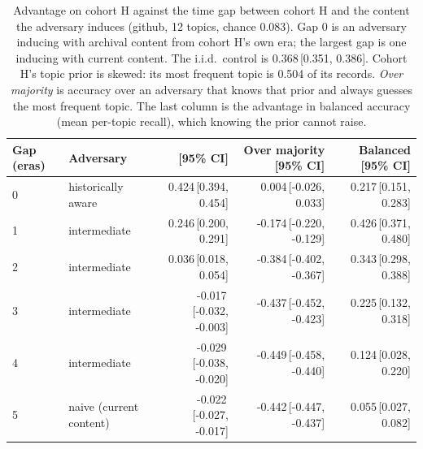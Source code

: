 \begin{table}[t]
\centering
\caption{Advantage on cohort H against the time gap between cohort H and the content the
adversary induces (github, 12 topics, chance
0.083). Gap 0 is an adversary inducing with archival content from cohort H's own
era; the largest gap is one inducing with current content. The i.i.d.\ control is
0.368\,[0.351, 0.386]. Cohort H's topic prior is skewed: its most frequent topic is
0.504 of its records. \emph{Over majority} is accuracy over an adversary
that knows that prior and always guesses the most frequent topic. The last column is the advantage in balanced accuracy (mean per-topic recall), which knowing the prior cannot raise.}
\label{tab:e4}
\small
\setlength{\tabcolsep}{4pt}
\begin{tabular}{llrrr}
\toprule
Gap (eras) & Adversary & \advhist{} [95\% CI] & Over majority [95\% CI] & Balanced [95\% CI] \\
\midrule
0 & historically aware & 0.424\,[0.394, 0.454] & 0.004\,[-0.026, 0.033] & 0.217\,[0.151, 0.283] \\
1 & intermediate & 0.246\,[0.200, 0.291] & -0.174\,[-0.220, -0.129] & 0.426\,[0.371, 0.480] \\
2 & intermediate & 0.036\,[0.018, 0.054] & -0.384\,[-0.402, -0.367] & 0.343\,[0.298, 0.388] \\
3 & intermediate & -0.017\,[-0.032, -0.003] & -0.437\,[-0.452, -0.423] & 0.225\,[0.132, 0.318] \\
4 & intermediate & -0.029\,[-0.038, -0.020] & -0.449\,[-0.458, -0.440] & 0.124\,[0.028, 0.220] \\
5 & naive (current content) & -0.022\,[-0.027, -0.017] & -0.442\,[-0.447, -0.437] & 0.055\,[0.027, 0.082] \\
\bottomrule
\end{tabular}
\end{table}
